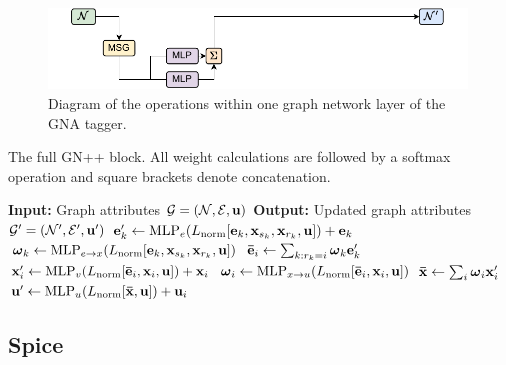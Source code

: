 \begin{figure}[h!]
    \centering
    \includegraphics[width=0.99\textwidth]{figures/flavour_tagging/gna.pdf}
    \caption{Diagram of the operations within one graph network layer of the GNA tagger.}
    \label{fig:gna_graph}
\end{figure}

\begin{algorithm}
    \caption{The full GN++ block. All weight calculations are followed by a softmax operation and square brackets denote concatenation.}
    \label{alg:gnpp}
    \begin{algorithmic}[1]
        \State \textbf{Input:} Graph attributes $\mathcal{G} = (\mathcal{N}, \mathcal{E}, \mathbf{u})$
        \State \textbf{Output:} Updated graph attributes $\mathcal{G}' = (\mathcal{N}', \mathcal{E}', \mathbf{u}')$
            \State $\mathbf{e}_k' \gets \text{MLP}_e(L_{\text{norm}}[\mathbf{e}_k, \mathbf{x}_{s_k}, \mathbf{x}_{r_k}, \mathbf{u}]) + \mathbf{e}_k$ 
            \State $\boldsymbol{\omega}_k \gets \text{MLP}_{e \to x}(L_{\text{norm}}[\mathbf{e}_k, \mathbf{x}_{s_k}, \mathbf{x}_{r_k}, \mathbf{u}])$ 
        \EndFor
            \State $\mathbf{\bar{\mathbf{e}}}_i \gets \sum_{k: r_k = i} \boldsymbol{\omega}_k \mathbf{e}_k'$ 
            \State $\mathbf{x}_i' \gets \text{MLP}_v(L_{\text{norm}}[\mathbf{\bar{\mathbf{e}}}_i, \mathbf{x}_i, \mathbf{u}]) + \mathbf{x}_i$ 
            \State $\boldsymbol{\omega}_i \gets \text{MLP}_{x \to u}(L_{\text{norm}}[\mathbf{\bar{\mathbf{e}}}_i, \mathbf{x}_i, \mathbf{u}])$ 
        \EndFor
        \State $\mathbf{\bar{x}} \gets \sum_{i} \boldsymbol{\omega}_i \mathbf{x}_i'$ 
        \State $\mathbf{u}' \gets \text{MLP}_u(L_{\text{norm}}[\mathbf{\bar{x}}, \mathbf{u}]) + \mathbf{u}_i$ 
    \end{algorithmic}
\end{algorithm}

\subsection{Spice}

